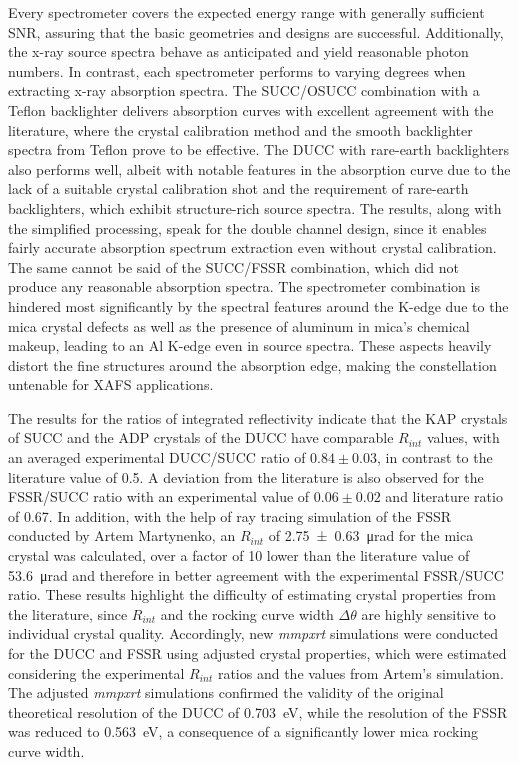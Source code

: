 Every spectrometer covers the expected energy range with generally sufficient SNR, assuring that the basic geometries and designs are successful. Additionally, the x-ray source spectra behave as anticipated and yield reasonable photon numbers. In contrast, each spectrometer performs to varying degrees when extracting x-ray absorption spectra. The SUCC/OSUCC combination with a Teflon backlighter delivers absorption curves with excellent agreement with the literature, where the crystal calibration method and the smooth backlighter spectra from Teflon prove to be effective. The DUCC with rare-earth backlighters also performs well, albeit with notable features in the absorption curve due to the lack of a suitable crystal calibration shot and the requirement of rare-earth backlighters, which exhibit structure-rich source spectra. The results, along with the simplified processing, speak for the double channel design, since it enables fairly accurate absorption spectrum extraction even without crystal calibration. The same cannot be said of the SUCC/FSSR combination, which did not produce any reasonable absorption spectra. The spectrometer combination is hindered most significantly by the spectral features around the K-edge due to the mica crystal defects as well as the presence of aluminum in mica's chemical makeup, leading to an Al K-edge even in source spectra. These aspects heavily distort the fine structures around the absorption edge, making the constellation untenable for XAFS applications.

The results for the ratios of integrated reflectivity indicate that the KAP crystals of SUCC and the ADP crystals of the DUCC have comparable $R_{int}$ values, with an averaged experimental DUCC/SUCC ratio of $0.84\pm0.03$, in contrast to the literature value of 0.5. A deviation from the literature is also observed for the FSSR/SUCC ratio with an experimental value of $0.06\pm0.02$ and literature ratio of 0.67. In addition, with the help of ray tracing simulation of the FSSR conducted by Artem Martynenko, an $R_{int}$ of \SI{2.75\pm0.63}{\micro\radian} for the mica crystal was calculated, over a factor of 10 lower than the literature value of \SI{53.6}{\micro\radian} \citep{holzer1998flat} and therefore in better agreement with the experimental FSSR/SUCC ratio. These results highlight the difficulty of estimating crystal properties from the literature, since $R_{int}$ and the rocking curve width $\Delta \theta$ are highly sensitive to individual crystal quality. Accordingly, new \textit{mmpxrt} simulations were conducted for the DUCC and FSSR using adjusted crystal properties, which were estimated considering the experimental $R_{int}$ ratios and the values from Artem's simulation. The adjusted \textit{mmpxrt} simulations confirmed the validity of the original theoretical resolution of the DUCC of \SI{0.703}{\electronvolt}, while the resolution of the FSSR was reduced to \SI{0.563}{\electronvolt}, a consequence of a significantly lower mica rocking curve width. 

